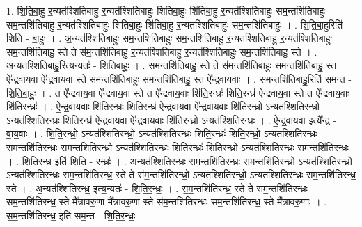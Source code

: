 \documentclass[17pt]{extarticle}
\begin{document}
1. शि॒ति॒बा॒हु र॒न्यत॑श्शितिबाहु र॒न्यत॑श्शितिबाहुः शितिबा॒हुः शि॑तिबा॒हु र॒न्यत॑श्शितिबाहुः सम॒न्तशि॑तिबाहुः सम॒न्तशि॑तिबाहु र॒न्यत॑श्शितिबाहुः शितिबा॒हुः शि॑तिबा॒हु र॒न्यत॑श्शितिबाहुः सम॒न्तशि॑तिबाहुः । . शि॒ति॒बा॒हुरिति॑ शिति - बा॒हुः । . अ॒न्यत॑श्शितिबाहुः सम॒न्तशि॑तिबाहुः सम॒न्तशि॑तिबाहु र॒न्यत॑श्शितिबाहु र॒न्यत॑श्शितिबाहुः सम॒न्तशि॑तिबाहु॒ स्ते ते स॑म॒न्तशि॑तिबाहु र॒न्यत॑श्शितिबाहु र॒न्यत॑श्शितिबाहुः सम॒न्तशि॑तिबाहु॒ स्ते । . अ॒न्यत॑श्शितिबाहु॒रित्य॒न्यतः॑ - शि॒ति॒बा॒हुः॒ । . स॒म॒न्तशि॑तिबाहु॒ स्ते ते स॑म॒न्तशि॑तिबाहुः सम॒न्तशि॑तिबाहु॒ स्त ऐ᳚न्द्रवाय॒वा ऐ᳚न्द्रवाय॒वा स्ते स॑म॒न्तशि॑तिबाहुः सम॒न्तशि॑तिबाहु॒ स्त ऐ᳚न्द्रवाय॒वाः । . स॒म॒न्तशि॑तिबाहु॒रिति॑ सम॒न्त - शि॒ति॒बा॒हुः॒ । . त ऐ᳚न्द्रवाय॒वा ऐ᳚न्द्रवाय॒वा स्ते त ऐ᳚न्द्रवाय॒वाः शि॑ति॒रन्ध्रः॑ शिति॒रन्ध्र॑ ऐन्द्रवाय॒वा स्ते त ऐ᳚न्द्रवाय॒वाः शि॑ति॒रन्ध्रः॑ । . ऐ॒न्द्र॒वा॒य॒वाः शि॑ति॒रन्ध्रः॑ शिति॒रन्ध्र॑ ऐन्द्रवाय॒वा ऐ᳚न्द्रवाय॒वाः शि॑ति॒रन्ध्रो॒ ऽन्यत॑श्शितिरन्ध्रो॒ ऽन्यत॑श्शितिरन्ध्रः शिति॒रन्ध्र॑ ऐन्द्रवाय॒वा ऐ᳚न्द्रवाय॒वाः शि॑ति॒रन्ध्रो॒ ऽन्यत॑श्शितिरन्ध्रः । . ऐ॒न्द्र॒वा॒य॒वा इत्यै᳚न्द्र - वा॒य॒वाः । . शि॒ति॒रन्ध्रो॒ ऽन्यत॑श्शितिरन्ध्रो॒ ऽन्यत॑श्शितिरन्ध्रः शिति॒रन्ध्रः॑ शिति॒रन्ध्रो॒ ऽन्यत॑श्शितिरन्ध्रः सम॒न्तशि॑तिरन्ध्रः सम॒न्तशि॑तिरन्ध्रो॒ ऽन्यत॑श्शितिरन्ध्रः शिति॒रन्ध्रः॑ शिति॒रन्ध्रो॒ ऽन्यत॑श्शितिरन्ध्रः सम॒न्तशि॑तिरन्ध्रः । . शि॒ति॒रन्ध्र॒ इति॑ शिति - रन्ध्रः॑ । . अ॒न्यत॑श्शितिरन्ध्रः सम॒न्तशि॑तिरन्ध्रः सम॒न्तशि॑तिरन्ध्रो॒ ऽन्यत॑श्शितिरन्ध्रो॒ ऽन्यत॑श्शितिरन्ध्रः सम॒न्तशि॑तिरन्ध्र॒ स्ते ते स॑म॒न्तशि॑तिरन्ध्रो॒ ऽन्यत॑श्शितिरन्ध्रो॒ ऽन्यत॑श्शितिरन्ध्रः सम॒न्तशि॑तिरन्ध्र॒ स्ते । . अ॒न्यत॑श्शितिरन्ध्र॒ इत्य॒न्यतः॑ - शि॒ति॒र॒न्ध्रः॒ । . स॒म॒न्तशि॑तिरन्ध्र॒ स्ते ते स॑म॒न्तशि॑तिरन्ध्रः सम॒न्तशि॑तिरन्ध्र॒ स्ते मै᳚त्रावरु॒णा मै᳚त्रावरु॒णा स्ते स॑म॒न्तशि॑तिरन्ध्रः सम॒न्तशि॑तिरन्ध्र॒ स्ते मै᳚त्रावरु॒णाः । . स॒म॒न्तशि॑तिरन्ध्र॒ इति॑ सम॒न्त - शि॒ति॒र॒न्ध्रः॒ । \newline
\end{document}

